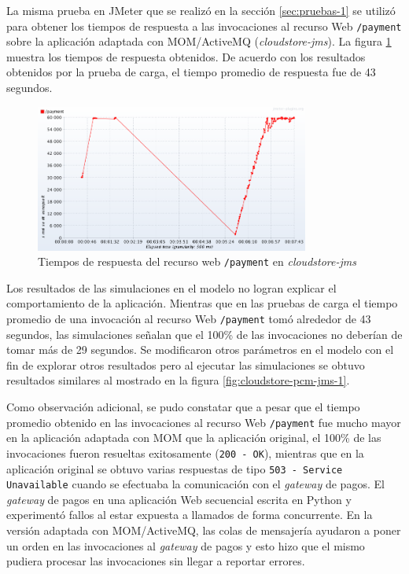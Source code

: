 \documentclass[conference]{IEEEtran}
\begin{document}
La misma prueba en JMeter que se realizó en la sección \ref{sec:pruebas-1} se utilizó para obtener los tiempos de respuesta a las invocaciones al recurso Web \texttt{/payment} sobre la aplicación adaptada con MOM/ActiveMQ (\emph{cloudstore-jms}). La figura \ref{fig:cloudstore-jmeter-jms-1} muestra los tiempos de respuesta obtenidos. De acuerdo con los resultados obtenidos por la prueba de carga, el tiempo promedio de respuesta fue de 43 segundos.

\begin{figure}[h]
  \centering
  \includegraphics[width=9cm]{cloudstore-jms-aws-1}
  \caption{\small{Tiempos de respuesta del recurso web \texttt{/payment} en \emph{cloudstore-jms}}}
  \label{fig:cloudstore-jmeter-jms-1}
\end{figure}

Los resultados de las simulaciones en el modelo no logran explicar el comportamiento de la aplicación. Mientras que en las pruebas de carga el tiempo promedio de una invocación al recurso Web \texttt{/payment} tomó alrededor de 43 segundos, las simulaciones señalan que el 100\% de las invocaciones no deberían de tomar más de 29 segundos. Se modificaron otros parámetros en el modelo con el fin de explorar otros resultados pero al ejecutar las simulaciones se obtuvo resultados similares al mostrado en la figura \ref{fig:cloudstore-pcm-jms-1}. 

Como observación adicional, se pudo constatar que a pesar que el tiempo promedio obtenido en las invocaciones al recurso Web \texttt{/payment} fue mucho mayor en la aplicación adaptada con MOM que la aplicación original, el 100\% de las invocaciones fueron resueltas exitosamente (\texttt{200 - OK}), mientras que en la aplicación original se obtuvo varias respuestas de tipo \texttt{503 - Service Unavailable} cuando se efectuaba la comunicación con el \emph{gateway} de pagos. El \emph{gateway} de pagos en una aplicación Web secuencial escrita en Python y experimentó fallos al estar expuesta a llamados de forma concurrente. En la versión adaptada con MOM/ActiveMQ, las colas de mensajería ayudaron a poner un orden en las invocaciones al \emph{gateway} de pagos y esto hizo que el mismo pudiera procesar las invocaciones sin llegar a reportar errores.
\end{document}

